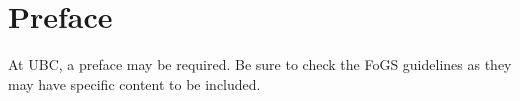 
\chapter{Preface}

At \ac{UBC}, a preface may be required.  Be sure to check the
\ac{FoGS} guidelines as they may have specific content to be included.
